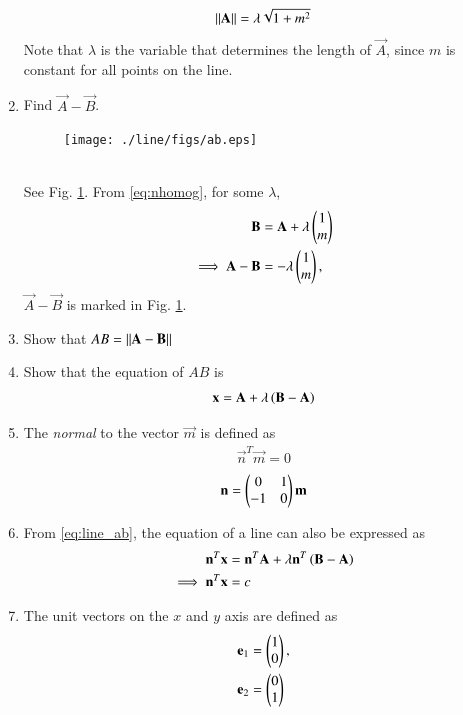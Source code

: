 \begin{enumerate}[label=\arabic*.,ref=\thesubsection.\theenumi]
\begin{equation}
\left\lVert\mathbf{A}\right\rVert = \lambda \sqrt{1+m^2}
\end{equation}
%
Note that $\lambda$ is the variable that determines the length of $\vec{A}$, 
since $m$ is constant for all points on the line.
%
\item Find $\vec{A}-\vec{B}$.
\begin{figure}
\centering
\texttt{[image: ./line/figs/ab.eps]}
\caption{}
\label{fig:ab}
\end{figure}
%
\\
\solution See Fig. \ref{fig:ab}. From \eqref{eq:nhomog}, for some 
$\lambda$,
\begin{align}
\mathbf{B} &=\mathbf{A} + \lambda \begin{pmatrix}1 \\ m\end{pmatrix}
\\
\implies \mathbf{A} - \mathbf{B} &= - \lambda \begin{pmatrix}1 \\ m\end{pmatrix},
\end{align}
%
$\vec{A} - \vec{B}$ is marked in Fig. \ref{fig:ab}.
%
\item Show that $AB = \left\lVert\mathbf{A}-\mathbf{B}\right\rVert$
\item Show that the equation of $AB$ is
\begin{align}
\label{eq:line_ab}
\mathbf{x} = \mathbf{A}+ \lambda\left(\mathbf{B}-\mathbf{A}\right)
\end{align}
%
\item The {\em normal} to the vector $\vec{m}$ is defined as
\begin{align}
\label{eq:normal}
\vec{n}^T\vec{m} = 0
\end{align}
\begin{align}
\label{eq:normal_omat}
\mathbf{n} = \begin{pmatrix}0 & 1\\ -1 & 0\end{pmatrix}\mathbf{m}
\end{align}
\item From \eqref{eq:line_ab}, the equation of a line can also be expressed as
\begin{align}
\label{eq:line_ab_normal}
\mathbf{n}^T\mathbf{x} &= \mathbf{n}^T\mathbf{A}+ \lambda\mathbf{n}^T\left(\mathbf{B}-\mathbf{A}\right)
\\
\implies \mathbf{n}^T\mathbf{x} &=c
\label{eq:line_normal}
\end{align}
\item The unit vectors on the $x$ and $y$ axis are defined as
\begin{align}
\label{eq:line_unit}
\mathbf{e}_1 &=\begin{pmatrix}1\\0\end{pmatrix}, 
\\
\mathbf{e}_2 &=\begin{pmatrix}0\\1\end{pmatrix}
\end{align}

\end{enumerate}
